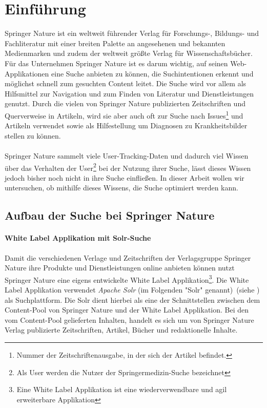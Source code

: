 %
\chapter{Einführung}
\label{sec:Einfuehrung}

Springer Nature ist ein weltweit führender Verlag für Forschungs-, Bildungs- und Fachliteratur mit einer breiten Palette an angesehenen und bekannten Medienmarken und zudem der weltweit größte Verlag für Wissenschaftsbücher. Für das Unternehmen Springer Nature ist es darum wichtig, auf seinen Web-Applikationen eine Suche anbieten zu können, die Suchintentionen erkennt und möglichst schnell zum gesuchten Content leitet. Die Suche wird vor allem als Hilfsmittel zur Navigation und zum Finden von Literatur und Dienstleistungen genutzt. Durch die vielen von Springer Nature publizierten Zeitschriften und Querverweise in Artikeln, wird sie aber auch oft zur Suche nach Issues\footnote{Nummer der Zeitschriftenausgabe, in der sich der Artikel befindet.} und Artikeln verwendet sowie als Hilfestellung um Diagnosen zu Krankheitsbilder stellen zu können.
\\
\\
Springer Nature sammelt viele User-Tracking-Daten und dadurch viel Wissen über das Verhalten der User\footnote{Als User werden die Nutzer der Springermedizin-Suche bezeichnet} bei der Nutzung ihrer Suche, lässt dieses Wissen jedoch bisher noch nicht in ihre Suche einfließen. In dieser Arbeit wollen wir untersuchen, ob mithilfe dieses Wissens, die Suche optimiert werden kann.


\section{Aufbau der Suche bei Springer Nature}
\label{sec:Einfuehrung:AufbauSucheBeiSpringerNature}

\subsubsection{White Label Applikation mit Solr-Suche}
\label{sec:Einfuehrung:AufbauSucheBeiSpringerNature:WhiteLabelApplikationSolr-Suche}

Damit die verschiedenen Verlage und Zeitschriften der Verlagsgruppe Springer Nature ihre Produkte und Dienstleistungen online anbieten können nutzt Springer Nature eine eigens entwickelte White Label Applikation\footnote{Eine White Label Applikation ist eine wiederverwendbare und agil erweiterbare Applikation}. Die White Label Applikation verwendet \textit{Apache Solr} (im Folgenden "Solr" genannt)~(siehe \cite{solr}) als Suchplattform. Die Solr dient hierbei als eine der Schnittstellen zwischen dem Content-Pool von Springer Nature und der White Label Applikation. Bei den vom Content-Pool gelieferten Inhalten, handelt es sich um von Springer Nature Verlag publizierte Zeitschriften, Artikel, Bücher und redaktionelle Inhalte.

